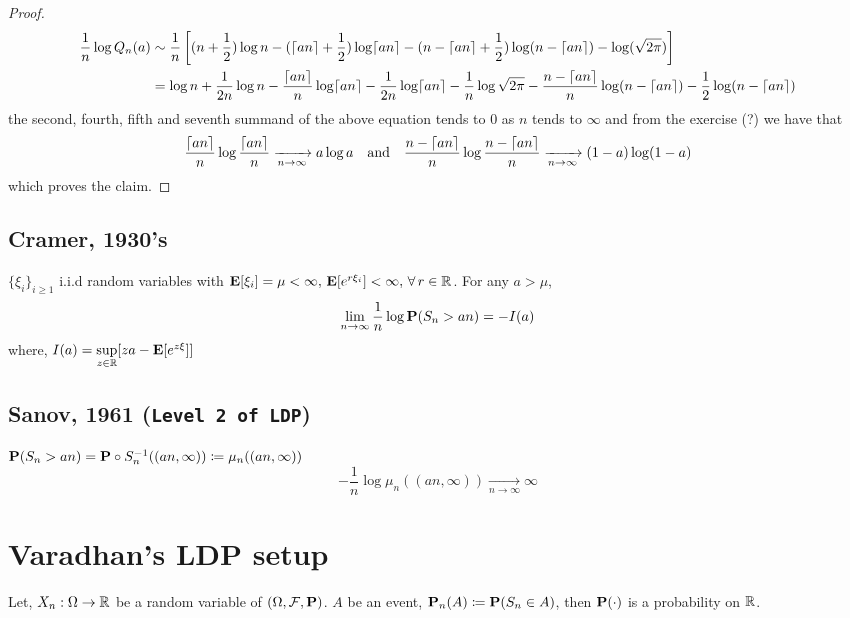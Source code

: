 \documentclass[main]{subfiles}
\begin{document}
\begin{proof}
	\begin{align*}
		\frac{1}{n}\log Q_{n}(a) & \sim \frac{1}{n}\left[ (n+\frac{1}{2})\log n - (\ceil{an}+\frac{1}{2})\log \ceil{an} - (n-\ceil{an} + \frac{1}{2})\log(n-\ceil{an})  - \log (\sqrt{2\pi})\right]                                         \\
		                         & = \log n + \frac{1}{2n}\log n - \frac{\ceil{an}}{n}\log \ceil{an} - \frac{1}{2n}\log \ceil{an} - \frac{1}{n}\log \sqrt{2\pi}-\frac{n- \ceil{an}}{n} \log (n - \ceil{an}) - \frac{1}{2}\log (n-\ceil{an})
	\end{align*}
	the second, fourth, fifth and seventh summand of the above equation tends to 0 as $n$ tends to $\infty$ and from the exercise (?) we have that
	$$\frac{\ceil{an}}{n}\log \frac{\ceil{an}}{n} \xrightarrow[n \rightarrow \infty]{} a\log a\,\,\,\,\,\,\text{and}\,\,\,\,\,\,\frac{n-\ceil{an}}{n}\log \frac{n-\ceil{an}}{n} \xrightarrow[n \rightarrow \infty]{} (1-a)\log (1-a)$$
	which proves the claim.
\end{proof}

\subsection*{Cramer, 1930's}
$\{\xi_i\}_{i\geq 1}$ i.i.d random variables with $\E[\xi_i] = \mu < \infty,\,\E[e^{r\xi_i}] < \infty,\,\forall \, r \in \R$. For any $a > \mu$,
$$\lim\limits_{n \to \infty} \frac{1}{n}\log \P(S_n > an) = -I(a)$$ where, $I(a) = \sup\limits_{z \in \R}[za-\E[e^{z\xi}]]$

\subsection*{Sanov, 1961 (\texttt{Level 2 of LDP})}
$\P(S_n > an) = \P \circ S_{n}^{-1}((an,\infty)) \coloneqq \mu_{n}((an,\infty))$
$$-\frac{1}{n}\log \mu_{n}((an,\infty)) \xrightarrow[n \rightarrow \infty]{} \infty$$

\section{Varadhan's LDP setup}
Let, $X_n : \Omega \to \R$ be a random variable of $(\Omega, \mathcal{F}, \P)$. $A$ be an event, $\P_{n}(A) \coloneqq \P(S_n \in A)$, then $\P(\cdot)$ is a probability on $\R$. \\
\end{document}
